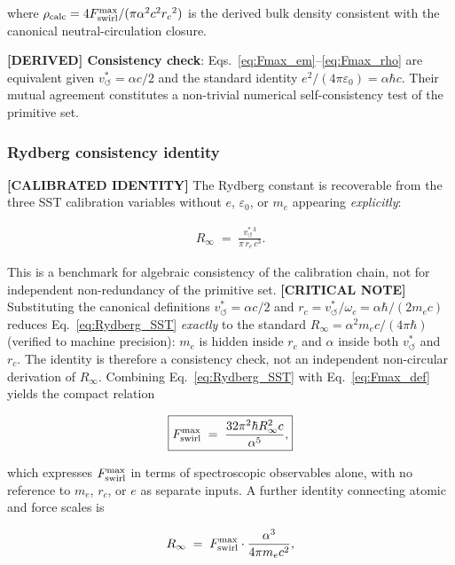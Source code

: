 \documentclass[11pt]{article}
\theoremstyle{definition}
\theoremstyle{plain}
\theoremstyle{remark}
\newcommand{\rc}{{r_c}}
\newcommand{\vchar}{v_{\!\boldsymbol{\circlearrowleft}}^{\ast}}
\begin{document}
        where $\rho_{\rm calc} = 4F_{\rm swirl}^{\max}/(\pi\alpha^2 c^2 \rc^2)$ is the derived bulk density consistent with the canonical neutral-circulation closure.

        \textbf{[DERIVED] Consistency check}: Eqs.~\eqref{eq:Fmax_em}--\eqref{eq:Fmax_rho} are equivalent given $\vchar = \alpha c/2$ and the standard identity $e^2/(4\pi\varepsilon_0) = \alpha\hbar c$. Their mutual agreement constitutes a non-trivial numerical self-consistency test of the primitive set.

        \subsubsection{Rydberg consistency identity}

        \textbf{[CALIBRATED IDENTITY]} The Rydberg constant is recoverable from the three SST calibration variables without $e$, $\varepsilon_0$, or $m_e$ appearing \emph{explicitly}:

        \begin{align}
            R_\infty \;=\; \frac{\vchar^3}{\pi\,\rc\,c^3}.
            \label{eq:Rydberg_SST}
        \end{align}

        This is a benchmark for algebraic consistency of the calibration chain, not for independent non-redundancy of the primitive set. \textbf{[CRITICAL NOTE]} Substituting the canonical definitions $\vchar=\alpha c/2$ and $\rc=\vchar/\omega_c=\alpha\hbar/(2m_ec)$ reduces Eq.~\eqref{eq:Rydberg_SST} \emph{exactly} to the standard $R_\infty=\alpha^2 m_e c/(4\pi\hbar)$ (verified to machine precision): $m_e$ is hidden inside $\rc$ and $\alpha$ inside both $\vchar$ and $\rc$. The identity is therefore a consistency check, not an independent non-circular derivation of $R_\infty$. Combining Eq.~\eqref{eq:Rydberg_SST} with Eq.~\eqref{eq:Fmax_def} yields the compact relation

        \begin{align}
            \boxed{
            F_{\rm swirl}^{\max}
            \;=\; \frac{32\pi^2\hbar R_\infty^2 c}{\alpha^5},
            }
            \label{eq:Fmax_Rydberg}
        \end{align}

        which expresses $F_{\rm swirl}^{\max}$ in terms of spectroscopic observables alone, with no reference to $m_e$, $\rc$, or $e$ as separate inputs. A further identity connecting atomic and force scales is

        \begin{align}
            R_\infty \;=\; F_{\rm swirl}^{\max} \cdot \frac{\alpha^3}{4\pi m_e c^2},
            \label{eq:Rydberg_Fmax}
        \end{align}
\end{document}
